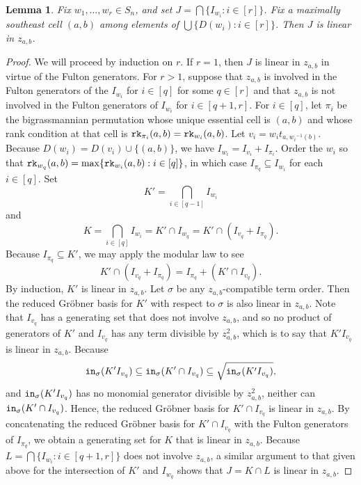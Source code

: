 \documentclass[12pt,reqno]{amsart}
\newtheorem{lemma}[theorem]{Lemma}
\newtheorem{Main Conjecture}[theorem]{Main Conjecture}
\theoremstyle{remark}
\theoremstyle{plain}
\newcommand{\init}{{\tt in}}
\newcommand{\rk}{{\tt rk}}
\begin{document}
\begin{lemma}\label{lem:linearJ}
Fix $w_1, \ldots, w_r \in S_n$, and set 
$J=\bigcap \{I_{w_i}:i\in[r]\}$.  Fix a maximally southeast cell $(a,b)$ among elements of 
$ \bigcup\{ D(w_i):i \in [r]\}$.
Then $J$ is linear in $z_{a,b}$.
\end{lemma}
\begin{proof}
We will proceed by induction on $r$.  If $r=1$, then $J$ is linear in $z_{a,b}$ in virtue of the Fulton generators.  For $r>1$, suppose that $z_{a,b}$ is involved in the Fulton generators of the $I_{w_i}$ for $i \in [q]$ for some $q \in [r]$ and that $z_{a,b}$ is not involved in the Fulton generators of $I_{w_i}$ for $i \in [q+1, r]$.  For $i \in [q]$, let $\pi_i$ be the bigrassmannian permutation whose unique essential cell is $(a,b)$ and whose rank condition at that cell is $\rk_{\pi_i}(a,b) = \rk_{w_i}(a,b)$.  Let $v_i = w_it_{a, {w_i}^{-1}(b)}$. Because $D(w_i) = D(v_i)\cup \{(a,b)\}$, we have $I_{w_i} = I_{v_i}+I_{\pi_i}$.  Order the $w_i$ so that $\rk_{w_q}(a,b) =  \max \{ \rk_{w_i}(a,b) :  i \in [q] \}$, in which case $I_{\pi_q} \subseteq I_{w_i}$ for each $i \in [q]$.
Set 
\[K' = \displaystyle \bigcap_{i \in [q-1]} I_{w_i}\] and \[
K =   \displaystyle \bigcap_{i \in [q]} I_{w_i} = K' \cap I_{w_q} = K' \cap (I_{v_q}+I_{\pi_q}).
\]
Because $I_{\pi_q} \subseteq K'$, we may apply the modular law to see \[
K' \cap (I_{v_q}+I_{\pi_q}) = I_{\pi_q} +(K' \cap I_{v_q}).
\]  By induction, $K'$ is linear in $z_{a,b}$.  Let $\sigma$ be any $z_{a,b}$-compatible term order.  Then the reduced Gr\"obner basis for $K'$ with respect to $\sigma$ is also linear in $z_{a,b}$.  Note that $I_{v_q}$ has a generating set that does not involve $z_{a,b}$, and so no product of generators of $K'$ and $I_{v_q}$ has any term divisible by $z_{a,b}^2$, which is to say that $K'I_{v_q}$ is linear in $z_{a,b}$.  
Because
\[
\init_\sigma(K'I_{v_q}) \subseteq \init_\sigma(K' \cap I_{v_q}) \subseteq \sqrt{\init_\sigma(K'I_{v_q})},
\] and $\init_\sigma(K'I_{v_q})$ has no monomial generator divisible by $z_{a,b}^2$, neither can $\init_\sigma(K' \cap I_{v_q})$.  Hence, the reduced Gr\"obner basis for $K' \cap I_{v_q}$ is linear in $z_{a,b}$.  By concatenating the reduced Gr\"obner basis for $K' \cap I_{v_q}$ with the Fulton generators of $I_{\pi_q}$, we obtain a generating set for $K$ that is linear in $z_{a,b}$.  Because 
$L =  \bigcap\{I_{w_i}:i \in [q+1,r]\} $
does not involve $z_{a,b}$, a similar argument to that given above for the intersection of $K'$ and $I_{w_q}$ shows that $J = K \cap L$ is linear in $z_{a,b}$.
\end{proof}
\end{document}
